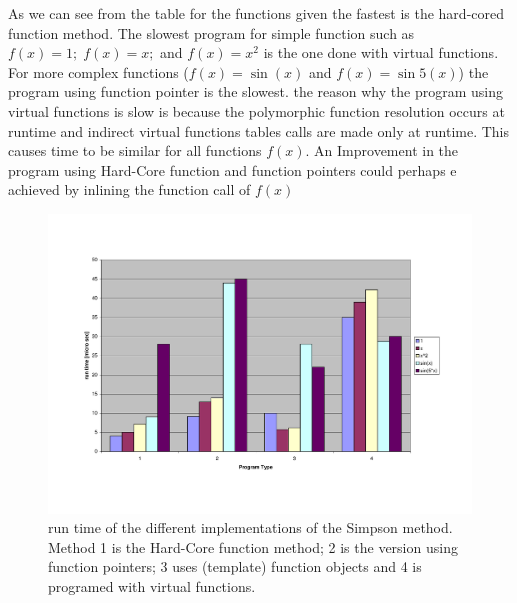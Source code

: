 \documentclass[a4paper,10pt]{article}
\begin{document}
As we can see from the table for the functions given the fastest is the hard-cored function method. The slowest program for simple function such as $f(x)=1; \; f(x)=x;$ and $f(x)=x^2$ is the one done with virtual functions. For more complex functions ($f(x)=\sin(x)$ and $f(x)=\sin5(x)$) the program  using function pointer is the slowest. 
the reason why the program using virtual functions is slow is because the polymorphic function resolution occurs at runtime and indirect virtual functions tables calls are made only at runtime. This causes time to be similar for all functions $f(x)$.
An Improvement in the program using Hard-Core function and function pointers could perhaps e achieved by inlining the function call of $f(x)$

\begin{figure}[h]
\centering
 \includegraphics[viewport=60pt 70pt 800pt 500pt, clip, width=\textwidth]{Graph}
 \caption{run time of the different implementations of the Simpson method. Method 1 is the Hard-Core function method; 2 is the version using function pointers; 3 uses  (template) function objects and 4 is programed with virtual functions. }
\label{fig4}
\end{figure}
\end{document}
